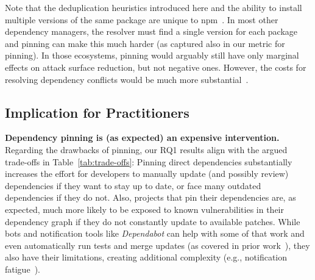 Note that the deduplication heuristics introduced here and the ability to install multiple versions of the same package are unique to npm~\cite{DBLP:journals/tosem/BogartKHT21}.
In most other dependency managers, the resolver must find a single version for each package and pinning can make this much harder (as captured also in our  metric for pinning).
In those ecosystems, pinning would arguably still have only marginal effects on attack surface reduction, but not negative ones.
However, the costs for resolving dependency conflicts would be much more substantial~\cite{DBLP:conf/sigsoft/WangWLWWYYZC18, DBLP:conf/icse/WangW0WLWYCX020}. 

\subsection{Implication for Practitioners}

\textbf{Dependency pinning is (as expected) an expensive intervention.}
Regarding the drawbacks of pinning, our RQ1 results align with the argued trade-offs in Table~\ref{tab:trade-offs}:
Pinning direct dependencies substantially increases the effort for developers to manually update (and possibly review) dependencies if they want to stay up to date, or face many outdated dependencies if they do not. 
Also, projects that pin their dependencies are, as expected, much more likely to be exposed to known vulnerabilities in their dependency graph if they do not constantly update to available patches. While bots and notification tools like \textit{Dependabot} can help with some of that work and even automatically run tests and merge updates (as covered in prior work~\cite[e.g.,][]{mirhosseini2017can,DBLP:conf/msr/AlfadelCSM21}), they also have their limitations, creating additional complexity (e.g., notification fatigue~\cite{DBLP:conf/sigsoft/HeHGZ21}).

